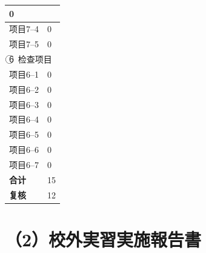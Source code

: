\documentclass[UTF8,10pt,a4paper,fontset=fandol]{ctexart}
\newcommand{\fieldvalue}[1]{#1}
\newcommand{\handwritten}[1]{#1}
\begin{document}
\begin{tabularx}{\textwidth}{|p{}|X|}
\fieldvalue{\handwritten{0}} \\
\hline
项目7--4 &
\fieldvalue{\handwritten{0}} \\
\hline
项目7--5 &
\fieldvalue{\handwritten{0}} \\
\hline
\multicolumn{2}{|l|}{\textcircled{6}\ 检查项目} \\
\hline
项目6--1 &
\fieldvalue{\handwritten{0}} \\
\hline
项目6--2 &
\fieldvalue{\handwritten{0}} \\
\hline
项目6--3 &
\fieldvalue{\handwritten{0}} \\
\hline
项目6--4 &
\fieldvalue{\handwritten{0}} \\
\hline
项目6--5 &
\fieldvalue{\handwritten{0}} \\
\hline
项目6--6 &
\fieldvalue{\handwritten{0}} \\
\hline
项目6--7 &
\fieldvalue{\handwritten{0}} \\
\hline
\textbf{合计} &
\fieldvalue{\handwritten{15}} \\
\hline
\textbf{复核} &
\fieldvalue{\handwritten{12}} \\
\hline
\end{tabularx}


\newpage

\section*{（2）校外実習実施報告書}
\end{document}
